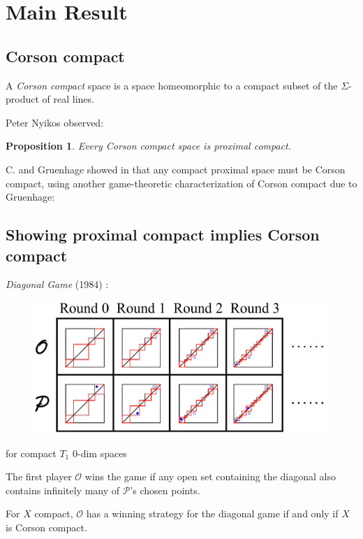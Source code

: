 \documentclass{beamer}
\newtheorem{proposition}[theorem]{Proposition}
\theoremstyle{definition}
\newcommand{\<}{\langle}
\renewcommand{\>}{\rangle}
\newcommand{\pl}[1]{\mathscr{#1}}
\newcommand{\term}{\textit}
\begin{document}
\section{Main Result}

\subsection{Corson compact}

\begin{frame}
  A \term{Corson compact} space is a space homeomorphic to a compact
  subset of the $\Sigma$-product of real lines.

  \vpause

  Peter Nyikos observed:

  \begin{proposition}
    Every Corson compact space is proximal compact. \cite{nyikosProximalPreprint}
  \end{proposition}

  \pause

  C. and Gruenhage showed in \cite{MR3227201} that any compact proximal
  space must be Corson compact, using another game-theoretic characterization
  of Corson compact due to Gruenhage:
\end{frame}

\subsection{Showing proximal compact implies Corson compact}

\begin{frame}
  \small
  \term{Diagonal Game} (1984) \cite{MR752278}:

  \begin{figure}
    \includegraphics[width=0.7\linewidth]{diagonalGame.pdf}
  \end{figure}
  {\tiny for compact $T_1$ $0$-dim spaces}

  \vpause

  The first player $\pl O$ wins the game if any open set containing the
  diagonal also contains infinitely many of $\pl P$'s chosen points.

  \begin{theorem}
    For $X$ compact, $\pl O$ has a winning strategy for the diagonal game
    if and only if $X$ is Corson compact.
  \end{theorem}
\end{frame}
\end{document}
